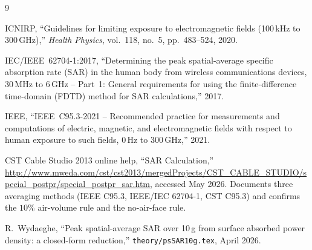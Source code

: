 \documentclass[11pt,a4paper]{article}
\theoremstyle{definition}
\theoremstyle{remark}
\begin{document}
\begin{thebibliography}{9}

ICNIRP, ``Guidelines for limiting exposure to electromagnetic fields
(100\,kHz to 300\,GHz),'' \emph{Health Physics}, vol.~118, no.~5,
pp.~483--524, 2020.

IEC/IEEE~62704-1:2017, ``Determining the peak spatial-average
specific absorption rate (SAR) in the human body from wireless
communications devices, 30\,MHz to 6\,GHz -- Part~1: General
requirements for using the finite-difference time-domain (FDTD)
method for SAR calculations,'' 2017.

IEEE, ``IEEE~C95.3-2021 -- Recommended practice for measurements
and computations of electric, magnetic, and electromagnetic fields
with respect to human exposure to such fields, 0\,Hz to 300\,GHz,''
2021.

CST Cable Studio 2013 online help, ``SAR Calculation,''
\url{http://www.mweda.com/cst/cst2013/mergedProjects/CST_CABLE_STUDIO/special_postpr/special_postpr_sar.htm},
accessed May 2026. Documents three averaging methods (IEEE C95.3,
IEEE/IEC 62704-1, CST C95.3) and confirms the $10\%$ air-volume rule
and the no-air-face rule.

R.~Wydaeghe, ``Peak spatial-average SAR over 10\,g from surface
absorbed power density: a closed-form reduction,''
\texttt{theory/psSAR10g.tex}, April 2026.

\end{thebibliography}
\end{document}
